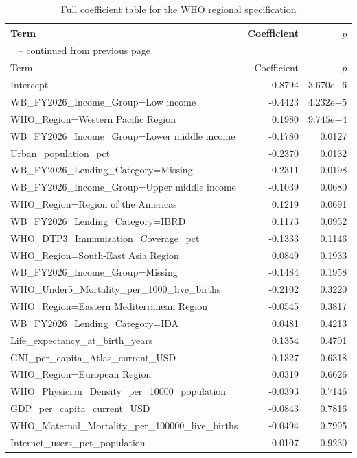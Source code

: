 \documentclass[runningheads]{llncs}
\begin{document}
{\begin{longtable}{p{}r@{\hspace{1.5em}}r}
\caption{Full coefficient table for the WHO regional specification}\label{tab:appendix-coefficients-who}\\
\hline
Term & Coefficient & $p$ \\
\hline
\endfirsthead
\multicolumn{3}{l}{\tablename\ \thetable{} -- continued from previous page}\\
\hline
Term & Coefficient & $p$ \\
\hline
\endhead
Intercept & 0.8794 & $3.670e{-6}$ \\
WB\_FY2026\_Income\_Group=Low income & -0.4423 & $4.232e{-5}$ \\
WHO\_Region=Western Pacific Region & 0.1980 & $9.745e{-4}$ \\
WB\_FY2026\_Income\_Group=Lower middle income & -0.1780 & 0.0127 \\
Urban\_population\_pct & -0.2370 & 0.0132 \\
WB\_FY2026\_Lending\_Category=Missing & 0.2311 & 0.0198 \\
WB\_FY2026\_Income\_Group=Upper middle income & -0.1039 & 0.0680 \\
WHO\_Region=Region of the Americas & 0.1219 & 0.0691 \\
WB\_FY2026\_Lending\_Category=IBRD & 0.1173 & 0.0952 \\
WHO\_DTP3\_Immunization\_Coverage\_pct & -0.1333 & 0.1146 \\
WHO\_Region=South-East Asia Region & 0.0849 & 0.1933 \\
WB\_FY2026\_Income\_Group=Missing & -0.1484 & 0.1958 \\
WHO\_Under5\_Mortality\_per\_1000\_live\_births & -0.2102 & 0.3220 \\
WHO\_Region=Eastern Mediterranean Region & -0.0545 & 0.3817 \\
WB\_FY2026\_Lending\_Category=IDA & 0.0481 & 0.4213 \\
Life\_expectancy\_at\_birth\_years & 0.1354 & 0.4701 \\
GNI\_per\_capita\_Atlas\_current\_USD & 0.1327 & 0.6318 \\
WHO\_Region=European Region & 0.0319 & 0.6626 \\
WHO\_Physician\_Density\_per\_10000\_population & -0.0393 & 0.7146 \\
GDP\_per\_capita\_current\_USD & -0.0843 & 0.7816 \\
WHO\_Maternal\_Mortality\_per\_100000\_live\_births & -0.0494 & 0.7995 \\
Internet\_users\_pct\_population & -0.0107 & 0.9230 \\
\hline
\end{longtable}

}
\end{document}
